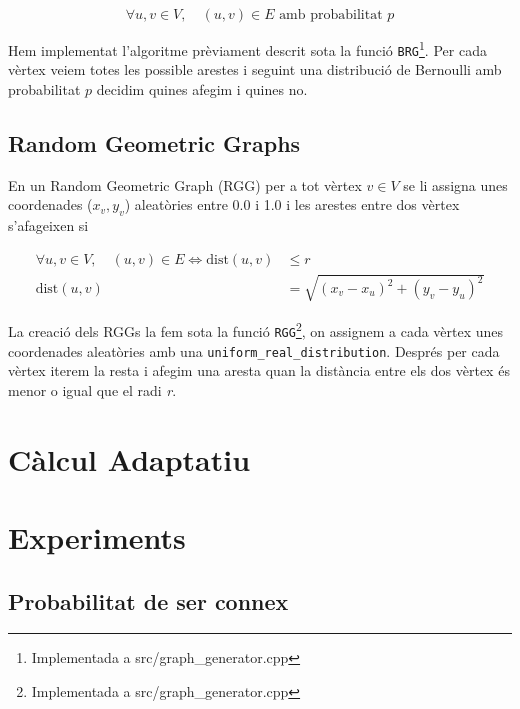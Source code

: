 \begin{equation}
    \forall u,v \in V,\quad (u,v) \in E \text{ amb probabilitat } p
\end{equation}

Hem implementat l'algoritme prèviament descrit sota la funció \texttt{BRG}\footnote{Implementada a src/graph\_generator.cpp}. Per cada vèrtex veiem totes les possible arestes i seguint una distribució de Bernoulli amb probabilitat $p$ decidim quines afegim i quines no.

\subsection{Random Geometric Graphs}
En un Random Geometric Graph (RGG)\cite{Diaz2007On} per a tot vèrtex $v \in V$ se li assigna unes coordenades ($x_v, y_v$) aleatòries entre 0.0 i 1.0 i les arestes entre dos vèrtex s'afageixen si

\begin{align}
    \forall u,v \in V,\quad (u,v) \in E \Longleftrightarrow \text{dist}(u,v) &\leq r \\
    \text{dist}(u,v) &= \sqrt{\left(x_v - x_u\right)^2 + \left(y_v - y_u\right)^2}
\end{align}

La creació dels RGGs la fem sota la funció \texttt{RGG}\footnote{Implementada a src/graph\_generator.cpp}, on assignem a cada vèrtex unes coordenades aleatòries amb una \texttt{uniform\_real\_distribution}. Després per cada vèrtex iterem la resta i afegim una aresta quan la distància entre els dos vèrtex és menor o igual que el radi \textit{r}.

\section{Càlcul Adaptatiu}

\section{Experiments}
\subsection{Probabilitat de ser connex}

